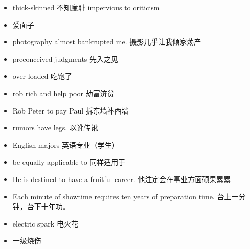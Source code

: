 \documentclass{ctexart}
\begin{document}
\begin{enumerate}
\begin{itemize}
  \item thick-skinned 不知廉耻 impervious to criticism 
  \item  爱面子 
  \item photography almost bankrupted me. 摄影几乎让我倾家荡产 
  \item preconceived judgments 先入之见
  \item over-loaded 吃饱了
  \item rob rich and help poor 劫富济贫
  \item Rob Peter to pay Paul 拆东墙补西墙
    \item rumors have legs. 以讹传讹 
 \item English majors 英语专业（学生） 
 \item be equally applicable to 同样适用于
 \item He is destined to have a fruitful career. 他注定会在事业方面硕果累累
 \item  Each minute of showtime requires ten years of preparation time. 台上一分钟，台下十年功。 
 \item electric spark 电火花 
 \item  一级烧伤

\end{itemize}
\end{enumerate}
\end{document}
